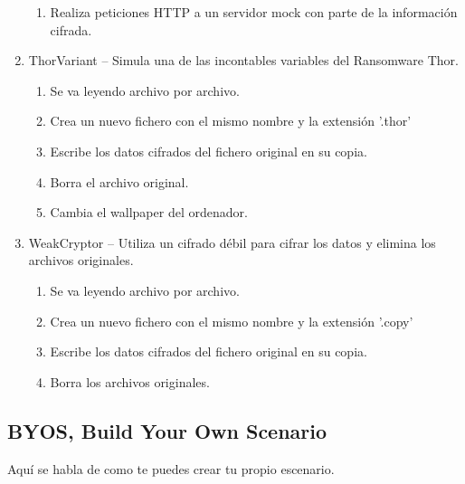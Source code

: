 \documentclass[a4paper,12pt]{article}
\begin{document}
\begin{enumerate}
\begin{enumerate}
	\item Realiza peticiones HTTP a un servidor mock con parte de la información cifrada.
\end{enumerate}
\item ThorVariant – Simula una de las incontables variables del Ransomware Thor.
\begin{enumerate}
	\item Se va leyendo archivo por archivo.
	\item Crea un nuevo fichero con el mismo nombre y la extensión '.thor'
	\item Escribe los datos cifrados del fichero original en su copia.
	\item Borra el archivo original.
	\item Cambia el wallpaper del ordenador.
\end{enumerate}
\item WeakCryptor – Utiliza un cifrado débil para cifrar los datos y elimina los archivos originales.
\begin{enumerate}
	\item Se va leyendo archivo por archivo.
	\item Crea un nuevo fichero con el mismo nombre y la extensión '.copy'
	\item Escribe los datos cifrados del fichero original en su copia.
	\item Borra los archivos originales.
\end{enumerate}
\end{enumerate}
\subsection{BYOS, Build Your Own Scenario}
Aquí se habla de como te puedes crear tu propio escenario.
\end{document}
